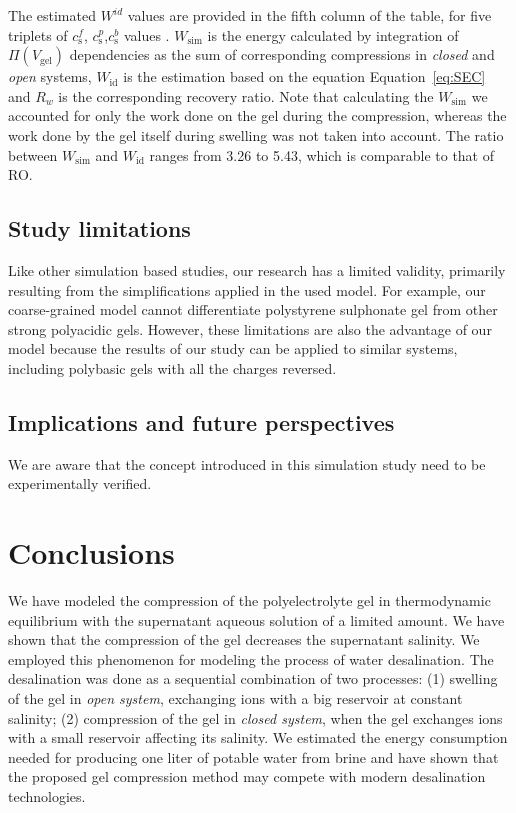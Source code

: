 \documentclass[journal,article,submit,pdftex,moreauthors]{Definitions/mdpi}
\newcommand{\cs}{c_{\mathrm{s}}}
\newcommand{\Vgel}{V_\mathrm{gel}}
\newcommand{\Pgel}{\Pi}
\newcommand{\refeq}[1]{Equation~\ref{#1}{}}
\begin{document}
The estimated $W^{id}$ values are provided in the fifth column of the table, for five triplets of $\cs^f$, $\cs^p$,$\cs^b$ values .
$W_{\mathrm{sim}}$ is the energy calculated by integration of $\Pgel(\Vgel)$ dependencies as the sum of corresponding compressions in \emph{closed} and \emph{open} systems, $W_{\mathrm{id}}$ is the estimation based on the equation \refeq{eq:SEC} and $R_w$ is the corresponding recovery ratio.
Note that calculating the $W_{\mathrm{sim}}$ we accounted for only the work done on the gel during the compression, whereas the work done by the gel itself during swelling was not taken into account.
The ratio between $W_{\mathrm{sim}}$ and $W_{\mathrm{id}}$ ranges from 3.26 to 5.43, which is comparable to that of RO.

\subsection{Study limitations}
Like other simulation based studies, our research has a limited validity,
primarily resulting from the simplifications applied in the used model.
For example, our coarse-grained model cannot differentiate polystyrene sulphonate gel from other strong polyacidic gels.
However, these limitations are also the advantage of our model because the results of our study
can be applied to similar systems, including polybasic gels with all the charges reversed.

\subsection{Implications and future perspectives}
We are aware that the concept introduced in this simulation study need to be experimentally verified.


\section{Conclusions}
We have modeled the compression of the polyelectrolyte gel in thermodynamic equilibrium with the supernatant aqueous solution of a limited amount.
We have shown that the compression of the gel decreases the supernatant salinity.
We employed this phenomenon for modeling the process of water desalination.
The desalination was done as a sequential combination of two processes:
(1) swelling of the gel in \emph{open system}, exchanging ions with a big reservoir at constant salinity;
(2) compression of the gel in \emph{closed system}, when the gel exchanges ions with a small reservoir affecting its salinity.
We estimated the energy consumption needed for producing one liter of potable water from brine and have shown that the proposed gel compression method may compete with modern desalination technologies.
\end{document}
